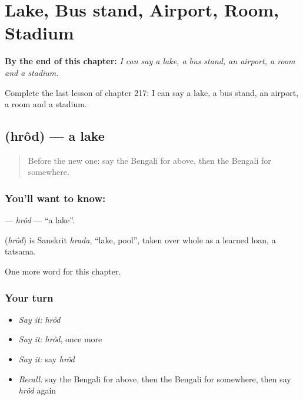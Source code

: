 
\chapter{Lake, Bus stand, Airport, Room, Stadium}
\label{ch:bn-lake-bus-stand-airport-room-stadium}

\begin{chapteropening}
\textbf{By the end of this chapter:} \emph{I can say a lake, a bus stand, an airport, a room and a stadium.}

Complete the last lesson of chapter 217: I can say a lake, a bus stand, an airport, a room and a stadium.
\end{chapteropening}

\section[\texorpdfstring{\bn{হ্রদ} (hrôd)}{হ্রদ (hrôd)}]{ (hrôd) — a lake}

\label{lesson:BN-C217-hrod}



\begin{quote}
Before the new one: say the Bengali for above, then the Bengali for somewhere.
\end{quote}

\subsection*{You'll want to know: }
\textbf{} — \emph{hrôd} — \textquotedblleft{}a lake\textquotedblright{}.

\begin{cousinweb}
\textbf{} (\emph{hrôd}) is Sanskrit \emph{hrada}, \textquotedblleft{}lake, pool\textquotedblright{}, taken over whole as a learned loan, a tatsama.
\end{cousinweb}

\begin{grammarlens}[title={What you've built}]
One more word for this chapter.
\end{grammarlens}

\subsection*{Your turn}
\begin{itemize}
\raggedright
  \item \emph{Say it:} \emph{hrôd}
  \item \emph{Say it:} \emph{hrôd}, once more
  \item \emph{Say it:} say \emph{hrôd}
  \item \emph{Recall:} say the Bengali for above, then the Bengali for somewhere, then say \emph{hrôd} again
\end{itemize}

